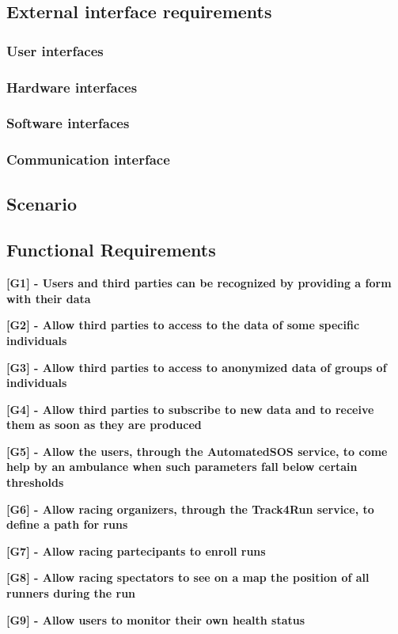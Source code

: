 
%

\subsection{External interface requirements}
\subsubsection{User interfaces}
\subsubsection{Hardware interfaces}
\subsubsection{Software interfaces}
\subsubsection{Communication interface}

\subsection{Scenario}

\subsection{Functional Requirements}
\textbf{[G1] - Users and third parties can be recognized by providing a form with their data}

\textbf{[G2] - Allow third parties to access to the data of some specific individuals}

\textbf{[G3] - Allow third parties to access to anonymized data of groups of individuals}

\textbf{[G4] - Allow third parties to subscribe to new data and to receive them as soon as they are produced}

\textbf{[G5] - Allow the users, through the AutomatedSOS service, to come help by an ambulance when such parameters fall below certain thresholds}

\textbf{[G6] - Allow racing organizers, through the Track4Run service, to define a path for runs}

\textbf{[G7] - Allow racing partecipants to enroll runs}

\textbf{[G8] - Allow racing spectators to see on a map the position of all runners during the run}

\textbf{[G9] - Allow users to monitor their own health status}

%